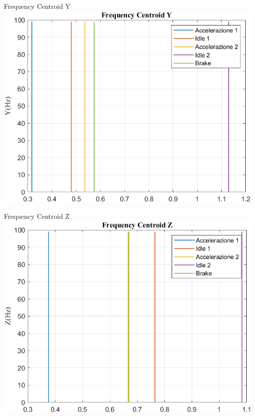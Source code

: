 \documentclass[beamer]{standalone}
\begin{document}
	\begin{frame}{{Frequency Centroid Y}}
		\centering\includegraphics[height=.8\textheight]{figure/Mag/Trasformata/Frequency CentroidY}
	\end{frame}
	
	\begin{frame}{{Frequency Centroid Z}}
		\centering\includegraphics[height=.8\textheight]{figure/Mag/Trasformata/Frequency CentroidZ}
	\end{frame}
	
\end{document}
